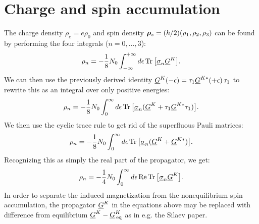 \clearpage
\section{Charge and spin accumulation}
The charge density $\rho_e = e\rho_0$ and spin density $\bm{\rho}_s = (\hbar/2)(\rho_1, \rho_2, \rho_3)$ can be found by performing the four integrals ($n=0,\ldots,3$):
\begin{equation}
  \rho_n = -\frac{1}{8}N_0 \int_{-\infty}^{+\infty} d\epsilon \operatorname{Tr}\big[ \underline{\sigma}_{n} \underline{G}^K \big].
\end{equation}
We can then use the previously derived identity $\underline{G}^K(-\epsilon) = \tau_{1} \underline{G}^{K*}(+\epsilon) \,\tau_{1}$ to rewrite this as an integral over only positive energies:
\begin{equation}
  \rho_n = -\frac{1}{8}N_0 \int_{0}^{\infty} d\epsilon \operatorname{Tr}\big[ \underline{\sigma}_{n} (\underline{G}^K + \tau_{1} \underline{G}^{K*} \tau_{1})\big].
\end{equation}
We then use the cyclic trace rule to get rid of the superfluous Pauli matrices:
\begin{equation}
  \rho_n = -\frac{1}{8}N_0 \int_{0}^{\infty} d\epsilon \operatorname{Tr}\big[ \underline{\sigma}_{n} (\underline{G}^K + \underline{G}^{K*})\big].
\end{equation}
Recognizing this as simply the real part of the propagator, we get:
\begin{equation}
  \rho_n = -\frac{1}{4}N_0 \int_{0}^{\infty} d\epsilon \operatorname{Re}\operatorname{Tr}\big[ \underline{\sigma}_{n} \underline{G}^K \big].
\end{equation}
In order to separate the induced magnetization from the nonequilibrium spin accumulation, the propagator $\underline{G}^K$ in the equations above may be replaced with difference from equilibrium $\underline{G}^K-\underline{G}^K_\text{\,eq}$ as in e.g. the Silaev paper.

\clearpage
